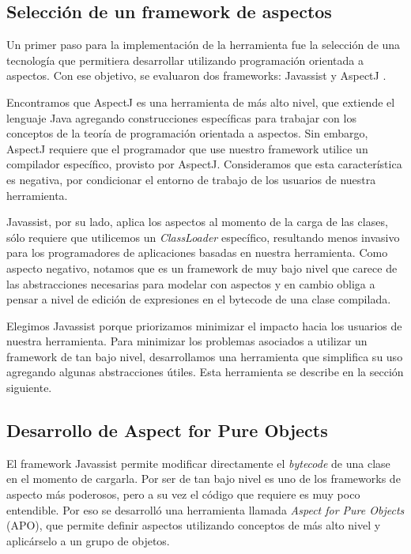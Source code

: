 		
	\subsection{Selección de un framework de aspectos}  
		Un primer paso para la implementación de la herramienta fue la selección de una
		tecnología que permitiera desarrollar utilizando programación orientada a
		aspectos.
		Con ese objetivo, se evaluaron dos frameworks: Javassist
		\cite{chiba00loadtime} y AspectJ \cite{KiczalesHHKPG01}.
		
		\medskip 
		Encontramos que AspectJ es una herramienta de más alto nivel, que extiende
		el lenguaje Java agregando construcciones específicas para trabajar con
		los conceptos de la teoría de programación orientada a aspectos.
		Sin embargo, AspectJ requiere que el programador que use nuestro framework
		utilice un compilador específico, provisto por AspectJ. 
		Consideramos que esta característica es negativa, por condicionar el
		entorno de trabajo de los usuarios de nuestra herramienta.
		
		Javassist, por su lado, aplica los aspectos al momento de
		la carga de las clases, sólo requiere que utilicemos un \emph{ClassLoader}
		específico, resultando menos invasivo para los programadores de aplicaciones
		basadas en nuestra herramienta.
		Como aspecto negativo, notamos que es un framework de muy bajo nivel que
		carece de las abstracciones necesarias para modelar con aspectos y en cambio
		obliga a pensar a nivel de edición de expresiones en el bytecode de una clase
		compilada.
		
		Elegimos Javassist porque priorizamos minimizar el impacto hacia los usuarios
		de nuestra herramienta.
		Para minimizar los problemas asociados a utilizar un framework de tan bajo
		nivel, desarrollamos una herramienta que simplifica su uso agregando algunas
		abstracciones útiles. Esta herramienta se describe en la sección siguiente.

	\subsection{Desarrollo de Aspect for Pure Objects}
		El framework Javassist permite modificar directamente el \emph{bytecode} de
		una clase en el momento de cargarla.
		Por ser de tan bajo nivel es uno de los frameworks de aspecto más poderosos,
		pero a su vez el código que requiere es muy poco entendible.
		Por eso se desarrolló una herramienta llamada \emph{Aspect for Pure Objects} (APO), 
		que permite definir aspectos utilizando conceptos de más alto nivel y
		aplicárselo a un grupo de objetos. 
		

